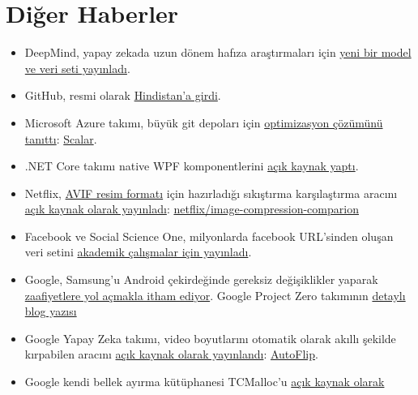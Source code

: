 \documentclass[11pt]{article}
\begin{document}
\section{Diğer Haberler}
\label{sec:org2597048}
\begin{itemize}
\item DeepMind, yapay zekada uzun dönem hafıza araştırmaları için \href{https://deepmind.com/blog/article/A\_new\_model\_and\_dataset\_for\_long-range\_memory}{yeni bir model
ve veri seti yayınladı}.
\item GitHub, resmi olarak \href{https://github.blog/2020-02-12-announcing-github-india/}{Hindistan'a girdi}.
\item Microsoft Azure takımı, büyük git depoları için \href{https://devblogs.microsoft.com/devops/introducing-scalar/}{optimizasyon çözümünü
tanıttı}: \href{https://github.com/microsoft/scalar/}{Scalar}.
\item .NET Core takımı native WPF komponentlerini \href{https://github.com/dotnet/wpf/issues/2554}{açık kaynak yaptı}.
\item Netflix, \href{https://aomediacodec.github.io/av1-avif/}{AVIF resim formatı} için hazırladığı sıkıştırma karşılaştırma
aracını \href{https://netflixtechblog.com/avif-for-next-generation-image-coding-b1d75675fe4}{açık kaynak olarak yayınladı}: \href{https://github.com/Netflix/image\_compression\_comparison}{netflix/image-compression-comparion}
\item Facebook ve Social Science One, milyonlarda facebook URL'sinden oluşan veri
setini \href{https://socialscience.one/blog/unprecedented-facebook-urls-dataset-now-available-research-through-social-science-one}{akademik çalışmalar için yayınladı}.
\item Google, Samsung'u Android çekirdeğinde gereksiz değişiklikler yaparak
\href{https://9to5google.com/2020/02/14/google-samsung-android-kernel-changes-security/}{zaafiyetlere yol açmakla itham ediyor}. Google Project Zero takımının \href{https://googleprojectzero.blogspot.com/2020/02/mitigations-are-attack-surface-too.html}{detaylı
blog yazısı}
\item Google Yapay Zeka takımı, video boyutlarını otomatik olarak akıllı şekilde
kırpabilen aracını \href{https://ai.googleblog.com/2020/02/autoflip-open-source-framework-for.html}{açık kaynak olarak yayınlandı}: \href{https://github.com/google/mediapipe/blob/master/mediapipe/docs/autoflip.md}{AutoFlip}.
\item Google kendi bellek ayırma kütüphanesi TCMalloc'u \href{https://abseil.io/blog/20200212-tcmalloc}{açık kaynak olarak
}
\end{itemize}
\end{document}
